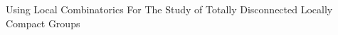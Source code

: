 \documentclass[preview]{standalone}
\begin{document}
\begin{center}
Using Local Combinatorics For The Study of Totally Disconnected Locally Compact Groups
\end{center}
\end{document}
